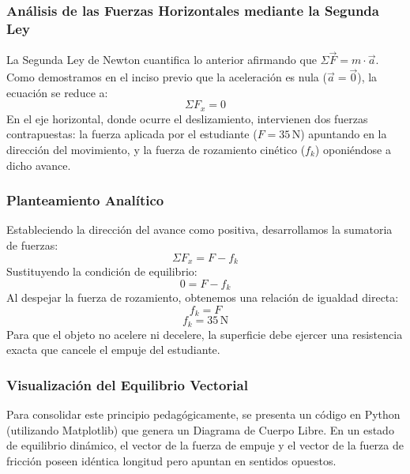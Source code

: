 \documentclass[12pt]{article}
\begin{document}
\subsubsection*{Análisis de las Fuerzas Horizontales mediante la Segunda Ley}
La Segunda Ley de Newton cuantifica lo anterior afirmando que $\Sigma \vec{F} = m \cdot \vec{a}$. Como demostramos en el inciso previo que la aceleración es nula ($\vec{a} = \vec{0}$), la ecuación se reduce a:
\begin{equation}
    \Sigma F_x = 0
\end{equation}
En el eje horizontal, donde ocurre el deslizamiento, intervienen dos fuerzas contrapuestas: la fuerza aplicada por el estudiante ($F = 35 \, \text{N}$) apuntando en la dirección del movimiento, y la fuerza de rozamiento cinético ($f_k$) oponiéndose a dicho avance.

\subsubsection*{Planteamiento Analítico}
Estableciendo la dirección del avance como positiva, desarrollamos la sumatoria de fuerzas:
\begin{equation}
    \Sigma F_x = F - f_k
\end{equation}
Sustituyendo la condición de equilibrio:
\begin{equation}
    0 = F - f_k
\end{equation}
Al despejar la fuerza de rozamiento, obtenemos una relación de igualdad directa:
\begin{equation}
    f_k = F
\end{equation}
\begin{equation}
    f_k = 35 \, \text{N}
\end{equation}
Para que el objeto no acelere ni decelere, la superficie debe ejercer una resistencia exacta que cancele el empuje del estudiante.

\subsubsection*{Visualización del Equilibrio Vectorial}
Para consolidar este principio pedagógicamente, se presenta un código en Python (utilizando Matplotlib) que genera un Diagrama de Cuerpo Libre. En un estado de equilibrio dinámico, el vector de la fuerza de empuje y el vector de la fuerza de fricción poseen idéntica longitud pero apuntan en sentidos opuestos.
\end{document}
